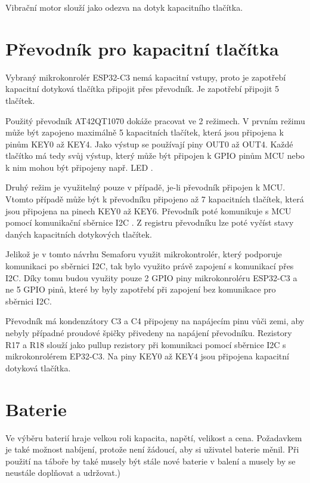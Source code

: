 Vibrační motor slouží jako odezva na dotyk kapacitního tlačítka. 


\section{Převodník pro kapacitní tlačítka}
Vybraný mikrokonrolér ESP32-C3 nemá kapacitní vstupy, proto je zapotřebí kapacitní dotyková tlačítka připojit přes převodník. Je zapotřebí připojit 
5 tlačítek. 

Použitý převodník AT42QT1070 dokáže pracovat ve 2 režimech. V prvním režimu může být zapojeno maximálně 5 kapacitních tlačítek, která jsou připojena
k pinům KEY0 až KEY4. Jako výstup se používají piny OUT0 až OUT4. Každé tlačítko má tedy svůj výstup, který může být připojen k GPIO pinům MCU 
nebo k nim mohou být připojeny např. LED \cite{conv_cap_but_AT42QT1070_dtsh}. 

Druhý režim je využitelný pouze v případě, je-li převodník připojen k MCU. Vtomto případě může být k převodníku připojeno až 7 kapacitních tlačítek, 
která jsou připojena na pinech KEY0 až KEY6. Převodník poté komunikuje s MCU pomocí komunikační sběrnice I2C \cite{conv_cap_but_AT42QT1070_dtsh}. 
Z registru převodníku lze poté vyčíst stavy daných kapacitních dotykových tlačítek. 

Jelikož je v tomto návrhu Semaforu využit mikrokontrolér, který podporuje komunikaci po sběrnici I2C, tak bylo využito právě zapojení s komunikací 
přes I2C. Díky tomu budou využity pouze 2 GPIO piny mikrokonroléru ESP32-C3 a ne 5 GPIO pinů, které by byly zapotřebí při zapojení bez komunikace pro
sběrnici I2C.

Převodník má kondenzátory C3 a C4 připojeny na napájecím pinu vůči zemi, aby nebyly případné proudové špičky přivedeny na napájení převodníku. Rezistory
R17 a R18 slouží jako pullup rezistory při komunikaci pomocí sběrnice I2C s mikrokonrolérem EP32-C3. Na piny KEY0 až KEY4 jsou připojena kapacitní 
dotyková tlačítka.  


\section{Baterie}
Ve výběru baterií hraje velkou roli kapacita, napětí, velikost a cena. Požadavkem je také možnost nabíjení, protože není žádoucí, aby si uživatel
baterie měnil. Při použití na táboře by také musely být stále nové baterie v balení a musely by se neustále doplňovat a udržovat.)

